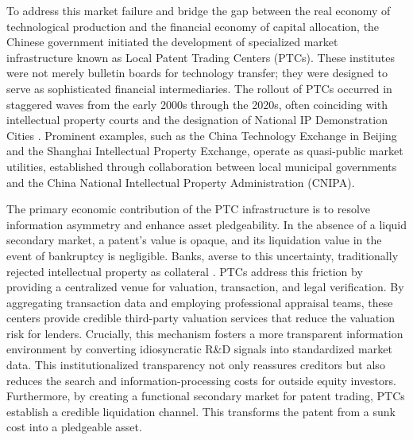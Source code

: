\documentclass[12pt,a4paper]{article}
\begin{document}
To address this market failure and bridge the gap between the real economy of technological production and the financial economy of capital allocation, the Chinese government initiated the development of specialized market infrastructure known as Local Patent Trading Centers (PTCs). These institutes were not merely bulletin boards for technology transfer; they were designed to serve as sophisticated financial intermediaries. The rollout of PTCs occurred in staggered waves from the early 2000s through the 2020s, often coinciding with intellectual property courts and the designation of National IP Demonstration Cities \citep{zou2024mode,chen2024does}. Prominent examples, such as the China Technology Exchange in Beijing and the Shanghai Intellectual Property Exchange, operate as quasi-public market utilities, established through collaboration between local municipal governments and the China National Intellectual Property Administration (CNIPA).

The primary economic contribution of the PTC infrastructure is to resolve information asymmetry and enhance asset pledgeability. In the absence of a liquid secondary market, a patent’s value is opaque, and its liquidation value in the event of bankruptcy is negligible. Banks, averse to this uncertainty, traditionally rejected intellectual property as collateral \citep{gill2024leveraging}. PTCs address this friction by providing a centralized venue for valuation, transaction, and legal verification. By aggregating transaction data and employing professional appraisal teams, these centers provide credible third-party valuation services that reduce the valuation risk for lenders. Crucially, this mechanism fosters a more transparent information environment by converting idiosyncratic R\&D signals into standardized market data. This institutionalized transparency not only reassures creditors but also reduces the search and information-processing costs for outside equity investors. Furthermore, by creating a functional secondary market for patent trading, PTCs establish a credible liquidation channel. This transforms the patent from a sunk cost into a pledgeable asset.
\end{document}
